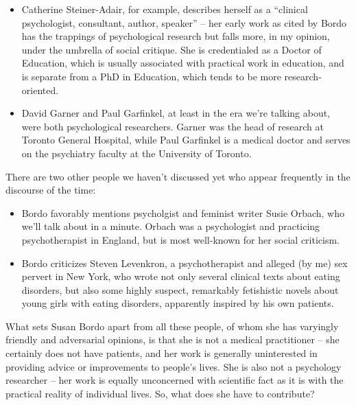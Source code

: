 \documentclass[11pt]{article}
\begin{document}
    \begin{itemize}
        \item Catherine Steiner-Adair, for example, describes herself as a ``clinical psychologist, consultant, author, speaker'' -- her early work as cited by Bordo has the trappings of psychological research but falls more, in my opinion, under the umbrella of social critique. She is credentialed as a Doctor of Education, which is usually associated with practical work in education, and is separate from a PhD in Education, which tends to be more research-oriented.

        \item David Garner and Paul Garfinkel, at least in the era we're talking about, were both psychological researchers. Garner was the head of research at Toronto General Hospital, while Paul Garfinkel is a medical doctor and serves on the psychiatry faculty at the University of Toronto. 
    \end{itemize}
    There are two other people we haven't discussed yet who appear frequently in the discourse of the time:
    \begin{itemize}
        \item Bordo favorably mentions psycholgist and feminist writer Susie Orbach, who we'll talk about in a minute. Orbach was a psychologist and practicing psychotherapist in England, but is most well-known for her social criticism.
        \item Bordo criticizes Steven Levenkron, a psychotherapist and alleged (by me) sex pervert in New York, who wrote not only several clinical texts about eating disorders, but also some highly suspect, remarkably fetishistic novels about young girls with eating disorders, apparently inspired by his own patients. 
    \end{itemize}

    What sets Susan Bordo apart from all these people, of whom she has varyingly friendly and adversarial opinions, is that she is not a medical practitioner -- she certainly does not have patients, and her work is generally uninterested in providing advice or improvements to people's lives. She is also not a psychology researcher -- her work is equally unconcerned with scientific fact as it is with the practical reality of individual lives. So, what does she have to contribute? 
\end{document}
